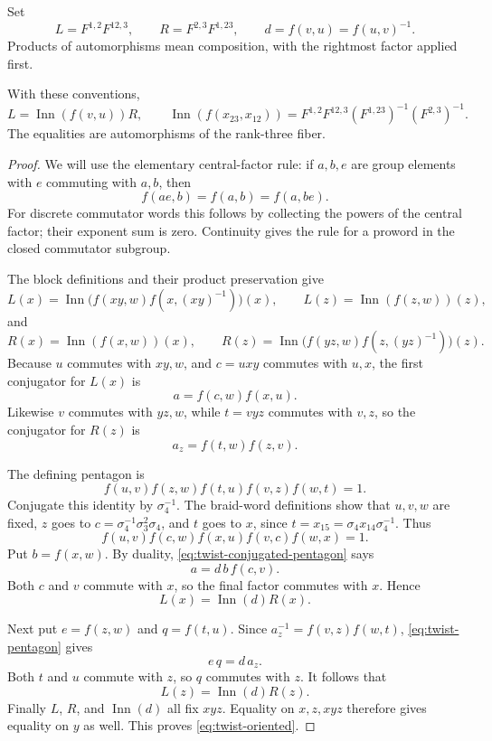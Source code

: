 Set
\[
 L=F^{1,2}F^{12,3},\qquad R=F^{2,3}F^{1,23},
 \qquad d=f(v,u)=f(u,v)^{-1}.
\]
Products of automorphisms mean composition, with the rightmost
factor applied first.

\begin{proposition}\label{prop:twist-oriented-pentagon}
With these conventions,
\begin{equation}
 L=\operatorname{Inn}(f(v,u))R,
 \qquad
 \operatorname{Inn}(f(x_{23},x_{12}))
 =F^{1,2}F^{12,3}(F^{1,23})^{-1}(F^{2,3})^{-1}.
                                                               \label{eq:twist-oriented}
\end{equation}
The equalities are automorphisms of the rank-three fiber.
\end{proposition}

\begin{proof}
We will use the elementary central-factor rule: if \(a,b,e\)
are group elements with \(e\) commuting with \(a,b\), then
\[
 f(ae,b)=f(a,b)=f(a,be).
\]
For discrete commutator words this follows by collecting the powers
of the central factor; their exponent sum is zero. Continuity gives
the rule for a proword in the closed commutator subgroup.

The block definitions and their product preservation give
\[
 L(x)=\operatorname{Inn}\bigl(f(xy,w)f(x,(xy)^{-1})\bigr)(x),
 \qquad L(z)=\operatorname{Inn}(f(z,w))(z),
\]
and
\[
 R(x)=\operatorname{Inn}(f(x,w))(x),\qquad
 R(z)=\operatorname{Inn}\bigl(f(yz,w)f(z,(yz)^{-1})\bigr)(z).
\]
Because \(u\) commutes with \(xy,w\), and \(c=uxy\)
commutes with \(u,x\), the first conjugator for \(L(x)\) is
\[
 a=f(c,w)f(x,u).
\]
Likewise \(v\) commutes with \(yz,w\), while \(t=vyz\)
commutes with \(v,z\), so the conjugator for \(R(z)\) is
\[
 a_z=f(t,w)f(z,v).
\]

The defining pentagon is
\begin{equation}
 f(u,v)f(z,w)f(t,u)f(v,z)f(w,t)=1.                    \label{eq:twist-pentagon}
\end{equation}
Conjugate this identity by \(\sigma_4^{-1}\). The braid-word
definitions show that \(u,v,w\) are fixed, \(z\) goes to
\(c=\sigma_4^{-1}\sigma_3^2\sigma_4\), and \(t\) goes
to \(x\), since \(t=x_{15}=\sigma_4x_{14}\sigma_4^{-1}\).
Thus
\begin{equation}
 f(u,v)f(c,w)f(x,u)f(v,c)f(w,x)=1.                    \label{eq:twist-conjugated-pentagon}
\end{equation}
Put \(b=f(x,w)\). By duality, \eqref{eq:twist-conjugated-pentagon} says
\[
 a=d\,b\,f(c,v).
\]
Both \(c\) and \(v\) commute with \(x\), so the final
factor commutes with \(x\). Hence
\[
 L(x)=\operatorname{Inn}(d)R(x).
\]

Next put \(e=f(z,w)\) and \(q=f(t,u)\). Since
\(a_z^{-1}=f(v,z)f(w,t)\), \eqref{eq:twist-pentagon} gives
\[
 e\,q=d\,a_z.
\]
Both \(t\) and \(u\) commute with \(z\), so \(q\)
commutes with \(z\). It follows that
\[
 L(z)=\operatorname{Inn}(d)R(z).
\]
Finally \(L\), \(R\), and \(\operatorname{Inn}(d)\)
all fix \(xyz\). Equality on \(x,z,xyz\) therefore gives
equality on \(y\) as well. This proves \eqref{eq:twist-oriented}.
\end{proof}

